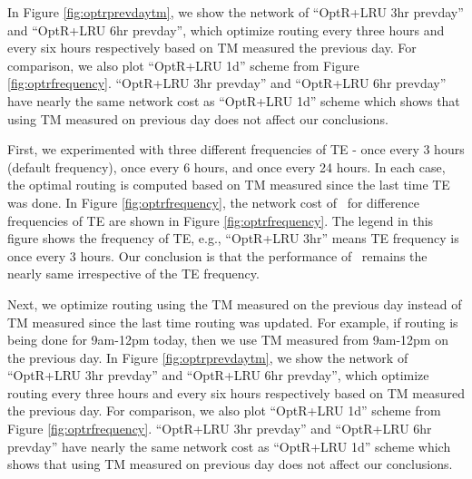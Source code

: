 \eat
{

In Figure \ref{fig:optrprevdaytm}, we show the network of ``OptR+LRU 3hr prevday'' and ``OptR+LRU 6hr prevday'', which optimize routing every three hours and every six hours respectively based on TM measured the previous day. For comparison, we also plot ``OptR+LRU 1d'' scheme from Figure \ref{fig:optrfrequency}. ``OptR+LRU 3hr prevday'' and ``OptR+LRU 6hr prevday'' have nearly the same network cost as ``OptR+LRU 1d'' scheme which shows that using TM measured on previous day does not affect our conclusions. 




First, we experimented with three different frequencies of TE - once every 3 hours (default frequency), once every 6 hours, and once every 24 hours. In each case, the optimal routing is computed based on TM measured since the last time TE was done.  In Figure \ref{fig:optrfrequency}, the network cost of \optlru\ for difference frequencies of TE are shown in Figure \ref{fig:optrfrequency}. The legend in this figure shows the frequency of TE, e.g., ``OptR+LRU 3hr'' means TE frequency is once every 3 hours. Our conclusion is that the performance of \optlru\ remains the nearly same irrespective of the TE frequency.

Next, we optimize routing using the TM measured on the previous day instead of TM measured since the last time routing was updated. For example, if routing is being done for 9am-12pm today, then we use TM measured from 9am-12pm on the previous day.  In Figure \ref{fig:optrprevdaytm}, we show the network of ``OptR+LRU 3hr prevday'' and ``OptR+LRU 6hr prevday'', which optimize routing every three hours and every six hours respectively based on TM measured the previous day. For comparison, we also plot ``OptR+LRU 1d'' scheme from Figure \ref{fig:optrfrequency}. ``OptR+LRU 3hr prevday'' and ``OptR+LRU 6hr prevday'' have nearly the same network cost as ``OptR+LRU 1d'' scheme which shows that using TM measured on previous day does not affect our conclusions. 






}
